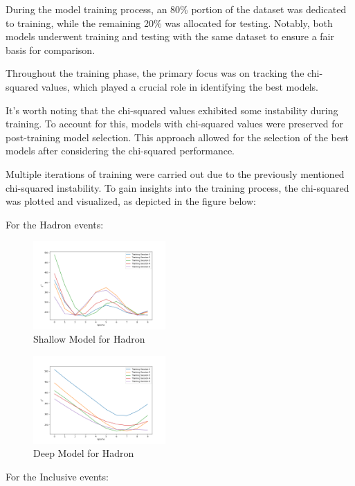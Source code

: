 \documentclass[EPJ,twocolumn]{webofc}
\begin{document}
During the model training process, an 80\% portion of the dataset was dedicated to training, while the remaining 20\% was allocated for testing. Notably, both models underwent training and testing with the same dataset to ensure a fair basis for comparison.

Throughout the training phase, the primary focus was on tracking the chi-squared values, which played a crucial role in identifying the best models.

It's worth noting that the chi-squared values exhibited some instability during training. To account for this, models with chi-squared values were preserved for post-training model selection. This approach allowed for the selection of the best models after considering the chi-squared performance.

Multiple iterations of training were carried out due to the previously mentioned chi-squared instability. To gain insights
into the training process, the chi-squared was plotted and visualized, as depicted
in the figure below:

For the Hadron events: 
\begin{figure}[H]
\centering
    \includegraphics[width=0.45\textwidth]{graphs/nn_hadrons_metrics.png}
    \caption{Shallow Model for Hadron}
    \label{fig:accuracy_loss_hadr}
\end{figure}
\begin{figure}[H]
\centering
    \includegraphics[width=0.45\textwidth]{graphs/nn_hadrons_metrics_deeper.png}
    \caption{Deep Model for Hadron}
    \label{fig:accuracy_loss_hadr_deep}
\end{figure}


For the Inclusive events:
\end{document}
